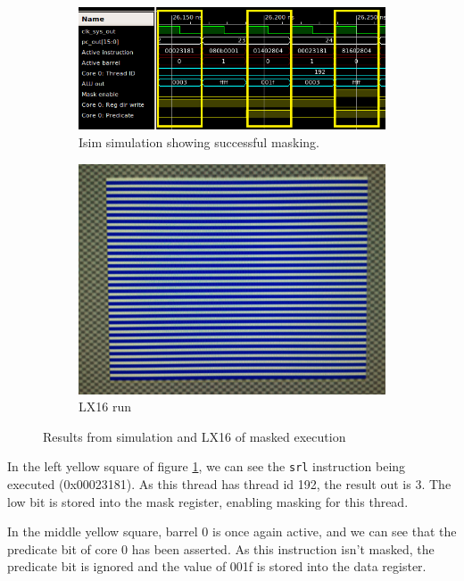 \documentclass[../main/report.tex]{subfiles}
\begin{document}
\begin{figure}[H]
  \centering
  \begin{subfigure}[b]{\textwidth}
    \includegraphics[width=\textwidth]{../testing/assets/masking-yes.png}
    \caption{Isim simulation showing successful masking.}
    \label{fig:isim-masked-execution}
  \end{subfigure}
  \begin{subfigure}[b]{0.3\textwidth}
    \includegraphics[width=\textwidth]{../testing/assets/lines.jpg}
    \caption{LX16 run}
    \label{fig:LX16-masked-execution}
  \end{subfigure}
  \caption{Results from simulation and LX16 of masked execution}
\end{figure}

In the left yellow square of figure \ref{fig:isim-masked-execution}, we can see the \verb/srl/ instruction being executed (0x00023181). As this thread has thread id 192, the result out is 3.
The low bit is stored into the mask register, enabling masking for this thread.

In the middle yellow square, barrel 0 is once again active, and we can see that the predicate bit of core 0 has been asserted.
As this instruction isn't masked, the predicate bit is ignored and the value of 001f is stored into the data register.
\end{document}
